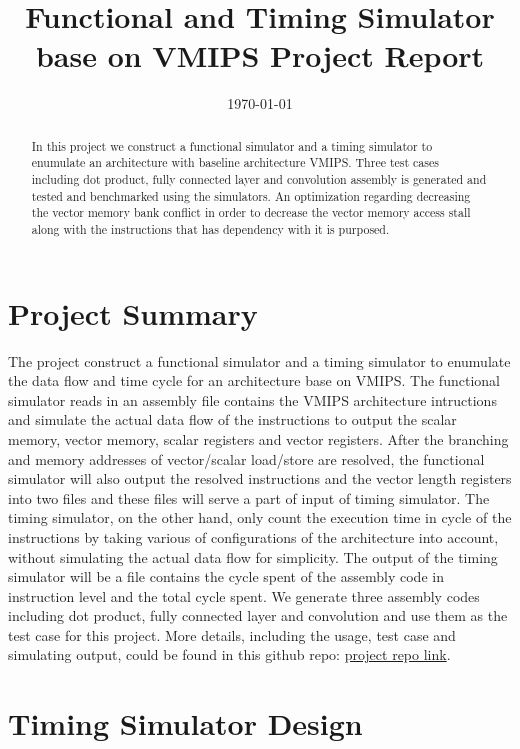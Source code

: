 \documentclass[conference]{IEEEtran}
\begin{document}
\title{Functional and Timing Simulator base on VMIPS Project Report}
\author{}
\date{\today}
\maketitle

\begin{abstract}
In this project we construct a functional simulator and a timing simulator to enumulate an architecture with baseline architecture VMIPS. Three test cases including dot product, fully connected layer and convolution assembly is generated and tested and benchmarked using the simulators. An optimization regarding decreasing the vector memory bank conflict in order to decrease the vector memory access stall along with the instructions that has dependency with it is purposed.
\end{abstract}

\section{Project Summary}
The project construct a functional simulator and a timing simulator to enumulate the data flow and time cycle for an architecture base on VMIPS. The functional simulator reads in an assembly file contains the VMIPS architecture intructions and simulate the actual data flow of the instructions to output the scalar memory, vector memory, scalar registers and vector registers. After the branching and memory addresses of vector/scalar load/store are resolved, the functional simulator will also output the resolved instructions and the vector length registers into two files and these files will serve a part of input of timing simulator. The timing simulator, on the other hand, only count the execution time in cycle of the instructions by taking various of configurations of the architecture into account, without simulating the actual data flow for simplicity. The output of the timing simulator will be a file contains the cycle spent of the assembly code in instruction level and the total cycle spent. We generate three assembly codes including dot product, fully connected layer and convolution and use them as the test case for this project. More details, including the usage, test case and simulating output, could be found in this github repo: \href{https://github.com/Xinrt/VMIPS_project}{project repo link}.

\section{Timing Simulator Design}
\end{document}
